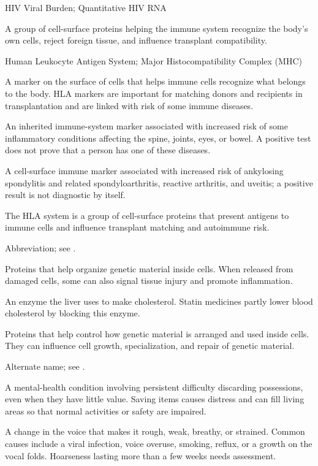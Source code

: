 \synonyms
HIV Viral Burden; Quantitative HIV RNA

 A group of cell-surface proteins helping the immune system recognize the body's own cells, reject foreign tissue, and influence transplant compatibility.

\synonyms
Human Leukocyte Antigen System; Major Histocompatibility Complex (MHC)

 A marker on the surface of cells that helps immune cells recognize what belongs to the body. HLA markers are important for matching donors and recipients in transplantation and are linked with risk of some immune diseases.

 An inherited immune-system marker associated with increased risk of some inflammatory conditions affecting the spine, joints, eyes, or bowel. A positive test does not prove that a person has one of these diseases.

 A cell-surface immune marker associated with increased risk of ankylosing spondylitis and related spondyloarthritis, reactive arthritis, and uveitis; a positive result is not diagnostic by itself.

 The HLA system is a group of cell-surface proteins that present antigens to immune cells and influence transplant matching and autoimmune risk.

 Abbreviation; see .

 Proteins that help organize genetic material inside cells. When released from damaged cells, some can also signal tissue injury and promote inflammation.

 An enzyme the liver uses to make cholesterol. Statin medicines partly lower blood cholesterol by blocking this enzyme.

 Proteins that help control how genetic material is arranged and used inside cells. They can influence cell growth, specialization, and repair of genetic material.

 Alternate name; see .

 A mental-health condition involving persistent difficulty discarding possessions, even when they have little value. Saving items causes distress and can fill living areas so that normal activities or safety are impaired.

 A change in the voice that makes it rough, weak, breathy, or strained. Common causes include a viral infection, voice overuse, smoking, reflux, or a growth on the vocal folds. Hoarseness lasting more than a few weeks needs assessment.

